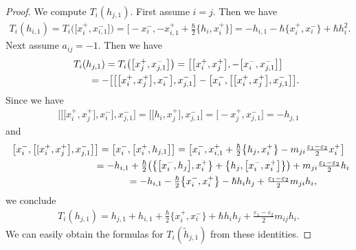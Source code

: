 \documentclass[pdftex]{sigma}
\theoremstyle{definition}
\numberwithin{equation}{section}
\newcommand{\ve}{\varepsilon}
\begin{document}
\begin{proof}
We compute $T_{i}(h_{j,1})$. First assume $i=j$. Then we have
\begin{gather*}
T_i(h_{i,1}) = T_i\big(\big[x_{i}^+,x_{i,1}^-\big]\big) = \big[{-}x_{i}^-, -x_{i,1}^+ + \tfrac{\hbar}{2}\big\{ h_i, x_i^+ \big\}\big] = -h_{i,1} - \hbar \big\{x_i^+,x_i^-\big\} + \hbar h_i^2.
\end{gather*}
Next assume $a_{ij}=-1$. Then we have
\begin{gather*}
T_i(h_{j,1}) = T_i\big(\big[x_{j}^+,x_{j,1}^-\big]\big) = \big[\big[x_i^+,x_{j}^+\big], -\big[x_i^-,x_{j,1}^-\big]\big] \\
\hphantom{T_i(h_{j,1})}{} = - \big[\big[\big[x_i^+,x_j^+\big],x_i^-\big],x_{j,1}^-\big]-\big[x_i^-,\big[\big[x_i^+,x_j^+\big],x_{j,1}^-\big]\big].
\end{gather*}
Since we have
\begin{gather*}
\big[\big[\big[x_i^+,x_j^+\big],x_i^-\big],x_{j,1}^-\big]=\big[\big[h_i,x_j^+\big],x_{j,1}^-\big]=\big[{-}x_j^+,x_{j,1}^-\big]=-h_{j,1}
\end{gather*}
and
\begin{gather*}
\big[x_i^-,\big[[x_i^+,x_j^+\big],x_{j,1}^-\big]\big] =\big[x_i^-,\big[x_i^+,h_{j,1}\big]\big] = \big[x_i^-,x_{i,1}^++\tfrac{\hbar}{2}\big\{h_j,x_i^+\big\}-m_{ji}\tfrac{\ve_1 - \ve_2}{2} x_i^+\big] \\
\hphantom{\big[x_i^-,\big[[x_i^+,x_j^+\big],x_{j,1}^-\big]\big]}{} = -h_{i,1} + \tfrac{\hbar}{2}\big( \big\{\big[x_i^-,h_j\big],x_i^+\big\} + \big\{ h_j, \big[x_i^-, x_i^+\big] \big\}\big) + m_{ji}\tfrac{\ve_1 - \ve_2}{2} h_i \\
\hphantom{\big[x_i^-,\big[[x_i^+,x_j^+\big],x_{j,1}^-\big]\big]}{} = -h_{i,1} - \tfrac{\hbar}{2} \big\{x_i^-,x_i^+\big\} - \hbar h_i h_j + \tfrac{\ve_1 - \ve_2}{2}m_{ji} h_i,
\end{gather*}
we conclude
\begin{gather*}
T_i(h_{j,1})=h_{j,1}+h_{i,1}+\tfrac{\hbar}{2} \big\{x_i^+,x_i^-\big\} + \hbar h_i h_j + \tfrac{\ve_1 - \ve_2}{2}m_{ij} h_i.
\end{gather*}
We can easily obtain the formulas for $T_{i}(\tilde{h}_{j,1})$ from these identities.
\end{proof}
\end{document}
